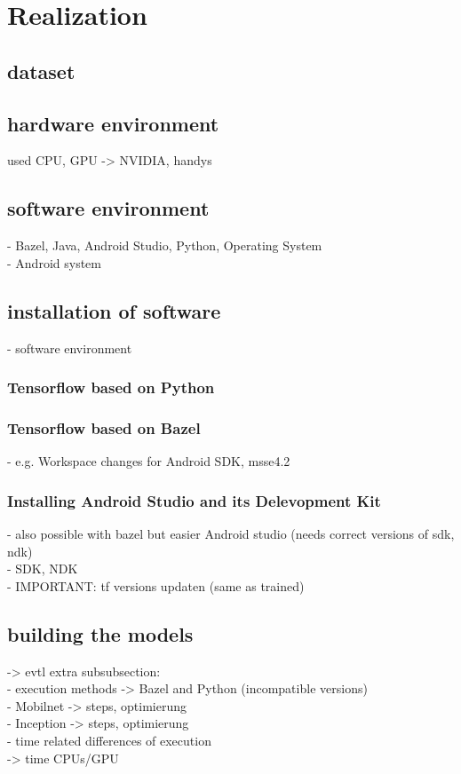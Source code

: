 \section{Realization}
	\subsection{dataset}
	\subsection{hardware environment}
		used CPU, GPU -> NVIDIA, handys
	\subsection{software environment}
	- Bazel, Java, Android Studio, Python, Operating System \\
 	- Android system
	\subsection{installation of software}
 		- software environment
			\subsubsection{Tensorflow based on Python}
			\subsubsection{Tensorflow based on Bazel}
				- e.g. Workspace changes for Android SDK, msse4.2
			\subsubsection{Installing Android Studio and its Delevopment Kit}
				- also possible with bazel but easier Android studio (needs correct versions of sdk, ndk) \\
				- SDK, NDK \\
				- IMPORTANT: tf versions updaten (same as trained)

	\subsection{building the models}
	-> evtl extra subsubsection: \\
		- execution methods -> Bazel and Python (incompatible versions) \\
		- Mobilnet -> steps, optimierung \\
		- Inception -> steps, optimierung \\
		- time related differences of execution  \\
		  -> time CPUs/GPU

